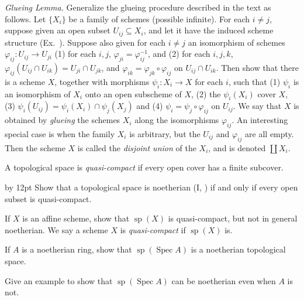 {{\vspace{2pt}
\noindent\hypertarget{ex-II-2.12}{}\emph{Glueing Lemma.} Generalize the glueing procedure described in the text  as follows. Let $\{X_i\}$ be a family of schemes (possible infinite). For each $i\ne j$, suppose given an open subset $U_{ij}\subseteq X_i$, and let it have the induced scheme structure (Ex.~). Suppose also given for each $i\ne j$ an isomorphism of schemes $\varphi_{ij}\colon U_{ij}\to U_{ji}$  (1) for each $i,j$, $\varphi_{ji}=\varphi_{ij}^{-1}$, and (2) for each $i,j,k$, $\varphi_{ij}(U_{ij}\cap U_{ik})=U_{ji}\cap U_{jk}$, and $\varphi_{ik}=\varphi_{jk}\circ\varphi_{ij}$ on $U_{ij}\cap U_{ik}$. Then show that there is a scheme $X$, together with morphisms $\psi_i\colon X_i\to X$ for each $i$, such that (1) $\psi_i$ is an isomorphism of $X_i$ onto an open subscheme of $X$, (2) the $\psi_i(X_i)$ cover $X$, (3) $\psi_i(U_{ij})=\psi_i(X_i)\cap\psi_j(X_j)$ and (4) $\psi_i=\psi_j\circ\varphi_{ij}$ on $U_{ij}$. We say that $X$ is obtained by \emph{glueing} the schemes $X_i$ along the isomorphisms $\varphi_{ij}$. An interesting special case is when the family $X_i$ is arbitrary, but the $U_{ij}$ and $\varphi_{ij}$ are all empty\EditionText{}. Then the scheme $X$ is called the \emph{disjoint union} of the $X_i$, and is denoted $\coprod X_i$.

\vspace{2pt}
\noindent\hypertarget{ex-II-2.13}{}A topological space is \emph{quasi-compact} if every open cover has a finite subcover.

{\advance\leftskip by 12pt
\noindent\hypertarget{ex-II-2.13a}{}Show that a topological space is noetherian (I, ) if and only if every open subset is quasi-compact.

\noindent\hypertarget{ex-II-2.13b}{}If $X$ is an affine scheme, show that $\operatorname{sp}(X)$ is quasi-compact, but not in general noetherian. We say a scheme $X$ is \emph{quasi-compact} if $\operatorname{sp}(X)$ is.

\noindent\hypertarget{ex-II-2.13c}{}If $A$ is a noetherian ring, show that $\operatorname{sp}(\operatorname{Spec}A)$ is a noetherian topological space.

\noindent\hypertarget{ex-II-2.13d}{}Give an example to show that $\operatorname{sp}(\operatorname{Spec}A)$ can be noetherian even when $A$ is not.\par}

}}

